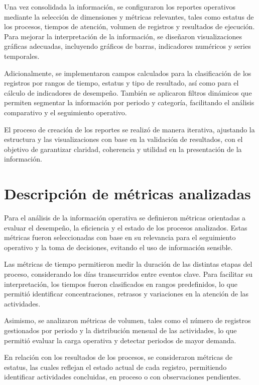 \documentclass[12pt]{article}
\begin{document}
Una vez consolidada la información, se configuraron los reportes operativos mediante la selección de dimensiones y métricas relevantes, tales como estatus de los procesos, tiempos de atención, volumen de registros y resultados de ejecución. Para mejorar la interpretación de la información, se diseñaron visualizaciones gráficas adecuadas, incluyendo gráficos de barras, indicadores numéricos y series temporales.

Adicionalmente, se implementaron campos calculados para la clasificación de los registros por rangos de tiempo, estatus y tipo de resultado, así como para el cálculo de indicadores de desempeño. También se aplicaron filtros dinámicos que permiten segmentar la información por periodo y categoría, facilitando el análisis comparativo y el seguimiento operativo.

El proceso de creación de los reportes se realizó de manera iterativa, ajustando la estructura y las visualizaciones con base en la validación de resultados, con el objetivo de garantizar claridad, coherencia y utilidad en la presentación de la información.


\section*{Descripción de métricas analizadas}
Para el análisis de la información operativa se definieron métricas orientadas a evaluar el desempeño, la eficiencia y el estado de los procesos analizados. Estas métricas fueron seleccionadas con base en su relevancia para el seguimiento operativo y la toma de decisiones, evitando el uso de información sensible.

Las métricas de tiempo permitieron medir la duración de las distintas etapas del proceso, considerando los días transcurridos entre eventos clave. Para facilitar su interpretación, los tiempos fueron clasificados en rangos predefinidos, lo que permitió identificar concentraciones, retrasos y variaciones en la atención de las actividades.

Asimismo, se analizaron métricas de volumen, tales como el número de registros gestionados por periodo y la distribución mensual de las actividades, lo que permitió evaluar la carga operativa y detectar periodos de mayor demanda.

En relación con los resultados de los procesos, se consideraron métricas de estatus, las cuales reflejan el estado actual de cada registro, permitiendo identificar actividades concluidas, en proceso o con observaciones pendientes.
\end{document}

